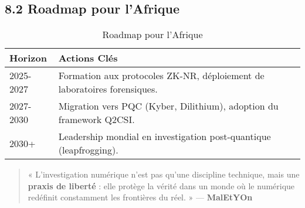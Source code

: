 \documentclass[12pt, a4paper]{report}
\begin{document}
\subsection*{8.2 Roadmap pour l’Afrique}
\begin{table}[h]
    \centering
    \caption{Roadmap pour l’Afrique}
    \begin{tabular}{|l|l|}
        \hline
        \textbf{Horizon} & \textbf{Actions Clés} \\ \hline
        2025-2027 & Formation aux protocoles ZK-NR, déploiement de laboratoires forensiques. \\ \hline
        2027-2030 & Migration vers PQC (Kyber, Dilithium), adoption du framework Q2CSI. \\ \hline
        2030+ & Leadership mondial en investigation post-quantique (leapfrogging). \\ \hline
    \end{tabular}
\end{table}

\begin{quote}
« L’investigation numérique n’est pas qu’une discipline technique, mais une \textbf{praxis de liberté} : elle protège la vérité dans un monde où le numérique redéfinit constamment les frontières du réel. »
— \textbf{MalEtYOn}
\end{quote}
\end{document}
